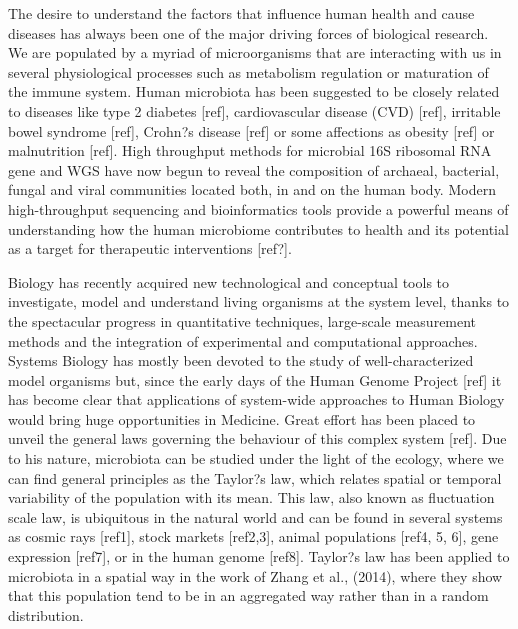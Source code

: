 The desire to understand the factors that influence human health and cause diseases has always been one of the major driving forces of biological research. We are populated by a myriad of microorganisms that are interacting with us in several physiological processes such as metabolism regulation or maturation of the immune system. Human microbiota has been suggested to be closely related to diseases like type 2 diabetes [ref], cardiovascular disease (CVD) [ref], irritable bowel syndrome [ref], Crohn?s disease [ref] or some affections as obesity [ref] or malnutrition [ref]. High throughput methods for microbial 16S ribosomal RNA gene and WGS have now begun to reveal the composition of archaeal, bacterial, fungal and viral communities located both, in and on the human body. Modern high-throughput sequencing and bioinformatics tools provide a powerful means of understanding how the human microbiome contributes to health and its potential as a target for therapeutic interventions [ref?]. 

Biology has recently acquired new technological and conceptual tools to investigate, model and understand living organisms at the system level, thanks to the spectacular progress in quantitative techniques, large-scale measurement methods and the integration of experimental and computational approaches. Systems Biology has mostly been devoted to the study of well-characterized model organisms but, since the early days of the Human Genome Project [ref] it has become clear that applications of system-wide approaches to Human Biology would bring huge opportunities in Medicine. Great effort has been placed to unveil the general laws governing the behaviour of this complex system [ref]. Due to his nature, microbiota can be studied under the light of the ecology, where we can find general principles as the Taylor?s law, which relates spatial or temporal variability of the population with its mean. This law, also known as fluctuation scale law, is ubiquitous in the natural world and can be found in several systems as cosmic rays [ref1], stock markets [ref2,3], animal populations [ref4, 5, 6], gene expression [ref7], or in the human genome [ref8]. Taylor?s law has been applied to microbiota in a spatial way in the work of Zhang et al., (2014), where they show that this population tend to be in an aggregated way rather than in a random distribution. 

